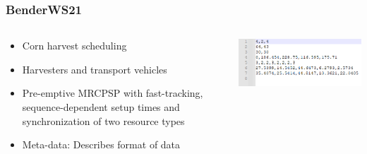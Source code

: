 \documentclass[dvipsnames,aspectratio=169]{beamer}
\begin{document}
\begin{frame}
\frametitle{BenderWS21 \cite{BenderWS21}}
\begin{columns}
\begin{column}{0.5\textwidth}
\begin{itemize}
\item Corn harvest scheduling
\item Harvesters and transport vehicles
\item Pre-emptive MRCPSP with fast-tracking,
sequence-dependent setup times and synchronization of two resource types
\item Meta-data: Describes format of data
\end{itemize}
\end{column}
\begin{column}{0.5\textwidth}
\includegraphics[width=\textwidth]{images/BenderWS21}
\end{column}
\end{columns}
\end{frame}
\end{document}
